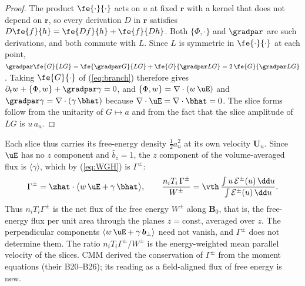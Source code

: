 \begin{proof}
The product $\fe{\cdot}{\cdot}$ acts on $u$ at fixed $\boldsymbol r$ with a kernel that does not depend on $\boldsymbol r$, so every derivation $D$ in $\boldsymbol r$ satisfies $D\fe{f}{h}=\fe{Df}{h}+\fe{f}{Dh}$. Both $\{\Phi,\cdot\}$ and $\gradpar$ are such derivations, and both commute with $L$. Since $L$ is symmetric in $\fe{\cdot}{\cdot}$ at each point, $\gradpar\fe{G}{LG}=\fe{\gradpar G}{LG}+\fe{G}{\gradpar LG}=2\,\fe{G}{\gradpar LG}$. Taking $\fe{G}{\cdot}$ of (\ref{eq:branch}) therefore gives $\partial_tw+\{\Phi,w\}+\gradpar\gamma=0$, and $\{\Phi,w\}=\nabla\cdot(w\,\uE)$ and $\gradpar\gamma=\nabla\cdot(\gamma\,\bhat)$ because $\nabla\cdot\uE=\nabla\cdot\bhat=0$. The slice forms follow from the unitarity of $G\mapsto a$ and from the fact that the slice amplitude of $LG$ is $u\,a_u$.
\end{proof}

Each slice thus carries its free-energy density $\tfrac12a_u^2$ at its own velocity $\boldsymbol U_u$. Since $\uE$ has no $z$ component and $\hat b_z=1$, the $z$ component of the volume-averaged flux is $\langle\gamma\rangle$, which by (\ref{eq:WGH}) is $\Gamma^\pm$:
\begin{equation}\label{eq:Gammaflux}
  \Gamma^\pm=\zhat\cdot\big\langle w\,\uE+\gamma\,\bhat\big\rangle,\qquad
  \frac{n_iT_i\,\Gamma^\pm}{W^\pm}=\vth\,\frac{\int u\,\mathcal E^\pm(u)\,\dd u}{\int\mathcal E^\pm(u)\,\dd u}.
\end{equation}
Thus $n_iT_i\Gamma^\pm$ is the net flux of the free energy $W^\pm$ along $\boldsymbol B_0$, that is, the free-energy flux per unit area through the planes $z=\mathrm{const}$, averaged over $z$. The perpendicular components $\langle w\,\uE+\gamma\,\boldsymbol b_\perp\rangle$ need not vanish, and $\Gamma^\pm$ does not determine them. The ratio $n_iT_i\Gamma^\pm/W^\pm$ is the energy-weighted mean parallel velocity of the slices. CMM derived the conservation of $\Gamma^\pm$ from the moment equations (their B20--B26); its reading as a field-aligned flux of free energy is new.
